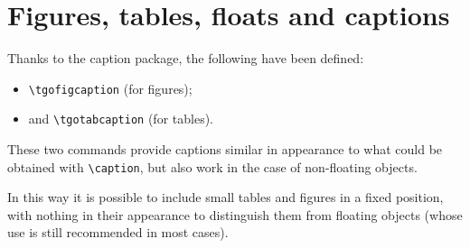 \documentclass[english,ColorTheme=Red,FontSize=10pt]{tango}
\newcommand\TO[1]{\textsf{#1}}
\begin{document}
\section{Figures, tables, floats and captions}\label{figtable}
Thanks to the \TO{caption} package, the following have been defined:
\begin{itemize}
\item\verb+\tgofigcaption+ (for figures);
\item and \verb+\tgotabcaption+ (for tables).
\end{itemize}
These two commands provide captions similar in appearance to what could be obtained with \verb+\caption+, but also work in the case of non-floating objects.

In this way it is possible to include small tables and figures in a fixed position, with nothing in their appearance to distinguish them from floating objects (whose use is still recommended in most cases).
\end{document}
